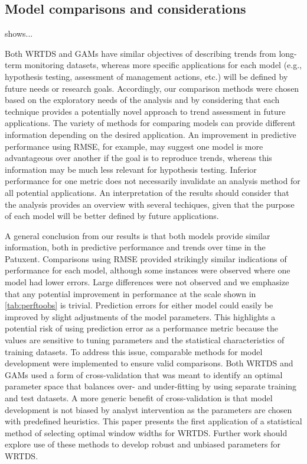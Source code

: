 \documentclass[letterpaper,12pt,oneside]{article}\usepackage[]{graphicx}\usepackage[]{color}
\begin{document}
\subsection*{Model comparisons and considerations}

 shows...

Both \ac{WRTDS} and \acp{GAM} have similar objectives of describing trends from long-term monitoring datasets, whereas more specific applications for each model (e.g., hypothesis testing, assessment of management actions, etc.) will be defined by future needs or research goals.  Accordingly, our comparison methods were chosen based on the exploratory needs of the analysis and by considering that each technique provides a potentially novel approach to trend assessment in future applications.  The variety of methods for comparing models can provide different information depending on the desired application.  An improvement in predictive performance using \ac{RMSE}, for example, may suggest one model is more advantageous over another if the goal is to reproduce trends, whereas this information may be much less relevant for hypothesis testing. Inferior performance for one metric does not necessarily invalidate an analysis method for all potential applications.  An interpretation of the results should consider that the analysis provides an overview with several techiques, given that the purpose of each model will be better defined by future applications. 

A general conclusion from our results is that both models provide similar information, both in predictive performance and trends over time in the Patuxent.  Comparisons using \ac{RMSE} provided strikingly similar indications of performance for each model, although some instances were observed where one model had lower errors.  Large differences were not observed and we emphasize that any potential improvement in performance at the scale shown in \cref{tab:perftoobs} is trivial.  Prediction errors for either model could easily be improved by slight adjustments of the model parameters.  This highlights a potential risk of using prediction error as a performance metric because the values are sensitive to tuning parameters and the statistical characteristics of training datasets. To address this issue, comparable methods for model development were implemented to ensure valid comparisons.  Both \ac{WRTDS} and \acp{GAM} used a form of cross-validation that was meant to identify an optimal parameter space that balances over- and under-fitting by using separate training and test datasets.  A more generic benefit of cross-validation is that model development is not biased by analyst intervention as the parameters are chosen with predefined heuristics.  This paper presents the first application of a statistical method of selecting optimal window widths for \ac{WRTDS}.  Further work should explore use of these methods to develop robust and unbiased parameters for \ac{WRTDS}. 
  
\end{document}
